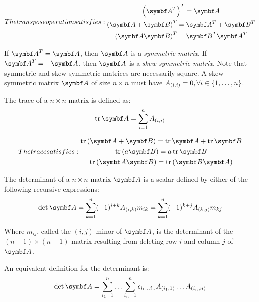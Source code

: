 \begin{subequations}
The transpose operation satisfies:
\begin{gather}
\trp{\tr{\mat{A}}} = \mat{A} \label{Eq.Res.MatTransSelf}\\
\tr{(\mat{A}+\mat{B})}=\tr{\mat{A}} + \tr{\mat{B}} \label{Eq.Res.MatTransSum}\\
\tr{(\mat{A}\mat{B})}=\tr{\mat{B}} \tr{\mat{A}} \label{Eq.Res.MatTransProd}
\end{gather}
\end{subequations}

If $\tr{\mat{A}}=\mat{A}$, then $\mat{A}$ is a \emph{symmetric matrix}. If $\tr{\mat{A}}=-\mat{A}$, then $\mat{A}$ is a \emph{skew-symmetric matrix}. Note that symmetric and skew-symmetric matrices are necessarily square. A skew-symmetric matrix $\mat{A}$ of size $n \times n$ must have $A_{(i,i)}=0, \forall i \in \{1,\dotsc,n\}$.

The trace of a $n \times n$ matrix is defined as:
\begin{equation} \label{Eq.Def.Trace}
\trace{\mat{A}} = \sum^{n}_{i=1} \ind{A}{i,i}
\end{equation}

\begin{subequations}
The trace satisfies:
\begin{gather}
\trace{\left( \mat{A} + \mat{B} \right)} = \trace{\mat{A}} + \trace{\mat{B}} \label{Eq.Res.TrSum}\\
\trace{\left(  a \mat{B}\right)} = a \trace{\mat{B}} \label{Eq.Res.TrScalar}\\
\trace{\left( \mat{A}\mat{B}\right)} = \trace{\left(\mat{B} \mat{A}\right)} \label{Eq.Res.TrProd}
\end{gather}
\end{subequations}

The determinant of a $n \times n$ matrix $\mat{A}$ is a scalar defined by either of the following recursive expressions:
\begin{equation} \label{Eq.Def.Determinant}
\det\mat{A} = \sum^{n}_{k=1}(-1)^{i+k}\ind{A}{i,k}m_{ik} = \sum^{n}_{k=1}(-1)^{k+j}\ind{A}{k,j}m_{kj}
\end{equation}

Where $m_{ij}$, called the $(i,j)$ minor of $\mat{A}$, is the determinant of the $(n-1) \times (n-1)$ matrix resulting from deleting row $i$ and column $j$ of $\mat{A}$.

An equivalent definition for the determinant is:
\begin{equation} \label{Eq.Def.DetLCND}
\det\mat{A} = \sum_{i_1=1}^{n} \ldots \sum_{i_n=1}^{n} \epsilon_{i_1 \dots i_n} \ind{A}{i_1,1} \dots \ind{A}{i_n,n}
\end{equation}

